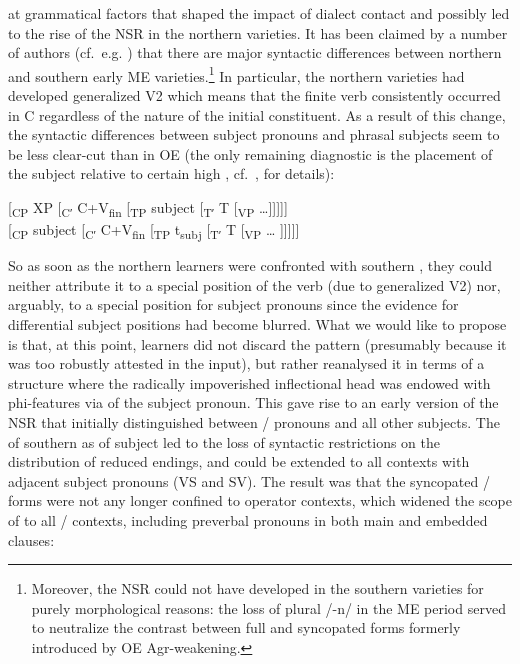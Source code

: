 \documentclass[output=paper]{langsci/langscibook}
\begin{document}
at grammatical factors that shaped the impact of dialect contact and possibly
led to the rise of the \gls{NSR} in the northern
varieties. It has been claimed by a number of authors (cf.\ e.g.
\citealt{Krochtaylor:1997,Trips:2002}) that there are major syntactic
differences between northern and southern early ME
varieties.\footnote{Moreover, the \gls{NSR} could not
    have developed in the southern varieties for purely morphological reasons:
    the loss of plural /-n/ in the \gls{ME} period served to
    neutralize the contrast between full and syncopated forms formerly
    introduced by \gls{OE} Agr-weakening.} In particular, the northern
    varieties had developed generalized V2 which means that the finite verb
    consistently occurred in C regardless of the nature of the initial
    constituent.  As a result of this change, the syntactic differences between
    subject pronouns and phrasal subjects seem to be less clear-cut than in
    \gls{OE} (the only remaining diagnostic is the placement of the subject
    relative to certain high , cf.\ \citealt{deHaas:2011},
    \citealt{deHaasandvanKemenade:2015} for details):

\ea
\ea \mbox[\textsubscript{CP} XP [\textsubscript{Cʹ} C+V\textsubscript{fin} [\textsubscript{TP} subject [\textsubscript{Tʹ} T [\textsubscript{VP} \ldots{}]]]]]\\
\ex \mbox[\textsubscript{CP} subject [\textsubscript{Cʹ} C+V\textsubscript{fin} [\textsubscript{TP} t\textsubscript{subj} [\textsubscript{Tʹ} T [\textsubscript{VP} \ldots{} ]]]]]
\z
\z

So as soon as the northern learners were confronted with southern
, they could neither attribute it to a special position
of the verb (due to generalized V2) nor, arguably, to a special position for
subject pronouns since the evidence for differential subject positions had
become blurred. What we would like to propose is that, at this point, learners
did not discard the pattern (presumably because it was too robustly attested in
the input), but rather reanalysed it in terms of a structure where the
radically impoverished inflectional head was endowed with
phi-features via  of the subject pronoun.
This gave rise to an early version of the \gls{NSR} that initially
distinguished between \Fpl/\Spl{} pronouns and all other subjects. The
 of southern  as 
of subject  led to the loss of syntactic restrictions on the
distribution of reduced endings, and  could be
extended to all contexts with adjacent subject pronouns (VS and SV). The result
was that the syncopated \Fpl/\Spl{} forms were not any longer confined to
operator contexts, which widened the scope of  to all
\Fpl/\Spl{} contexts, including preverbal pronouns in both main and embedded
clauses:
\end{document}
